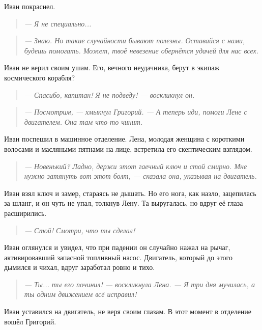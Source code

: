 \documentclass[12pt,a4paper]{book} %
\newenvironment{dialogue}{\begin{quote}\itshape}{\end{quote}}
\begin{document}
Иван покраснел.

\begin{dialogue}
--- Я не специально...
\end{dialogue}

\begin{dialogue}
--- Знаю. Но такие случайности бывают полезны. Оставайся с нами, будешь помогать. Может, твоё невезение обернётся удачей для нас всех.
\end{dialogue}

Иван не верил своим ушам. Его, вечного неудачника, берут в экипаж космического корабля?

\begin{dialogue}
--- Спасибо, капитан! Я не подведу! --- воскликнул он.
\end{dialogue}

\begin{dialogue}
--- Посмотрим, --- хмыкнул Григорий. --- А теперь иди, помоги Лене с двигателем. Она там что-то чинит.
\end{dialogue}

Иван поспешил в машинное отделение. Лена, молодая женщина с короткими волосами и масляными пятнами на лице, встретила его скептическим взглядом.

\begin{dialogue}
--- Новенький? Ладно, держи этот гаечный ключ и стой смирно. Мне нужно затянуть вот этот болт, --- сказала она, указывая на двигатель.
\end{dialogue}

Иван взял ключ и замер, стараясь не дышать. Но его нога, как назло, зацепилась за шланг, и он чуть не упал, толкнув Лену. Та выругалась, но вдруг её глаза расширились.

\begin{dialogue}
--- Стой! Смотри, что ты сделал!
\end{dialogue}

Иван оглянулся и увидел, что при падении он случайно нажал на рычаг, активировавший запасной топливный насос. Двигатель, который до этого дымился и чихал, вдруг заработал ровно и тихо.

\begin{dialogue}
--- Ты... ты его починил! --- воскликнула Лена. --- Я три дня мучилась, а ты одним движением всё исправил!
\end{dialogue}

Иван уставился на двигатель, не веря своим глазам. В этот момент в отделение вошёл Григорий.
\end{document}
